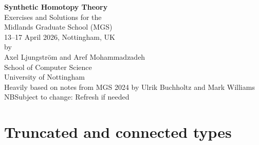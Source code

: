 \documentclass[10pt,oneside,leqno,openright]{memoir}
\begin{document}
\frontmatter
\thispagestyle{empty}
\begin{center}
  \LARGE
  {\bfseries Synthetic Homotopy Theory}\\[1cm]
  \large Exercises and Solutions for the\\[5mm]
  \Large Midlands Graduate School (MGS)\\
  \large 13--17 April 2026, Nottingham, UK\\[1cm]
  by\\
  Axel Ljungström and Aref Mohammadzadeh\\
  School of Computer Science\\
  University of Nottingham\\[1cm]
  Heavily based on notes from MGS 2024 by
  Ulrik Buchholtz and Mark Williams\\
  \Large NB\enspace Subject to change: Refresh if needed
\end{center}

\vfill


\clearpage

\tableofcontents*

\mainmatter



\chapter{Truncated and connected types}
\end{document}
